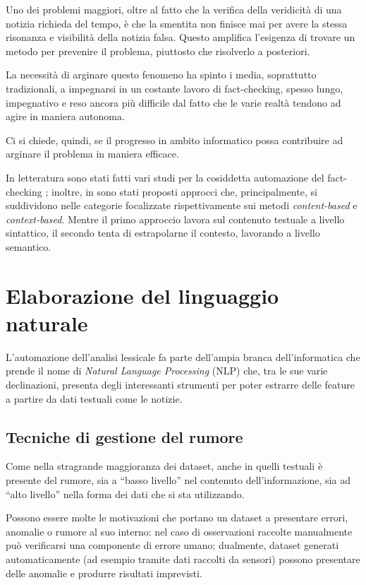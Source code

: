\documentclass[12pt]{report}
\theoremstyle{definition}
\begin{document}
Uno dei problemi maggiori, oltre al fatto che la verifica della veridicità di una notizia richieda del tempo, è che la smentita non finisce mai per avere la stessa risonanza e visibilità della notizia falsa. Questo amplifica l'esigenza di trovare un metodo per prevenire il problema, piuttosto che risolverlo a posteriori.

La necessità di arginare questo fenomeno ha spinto i media, soprattutto tradizionali, a impegnarsi in un costante lavoro di fact-checking, spesso lungo, impegnativo e reso ancora più difficile dal fatto che le varie realtà tendono ad agire in maniera autonoma.

Ci si chiede, quindi, se il progresso in ambito informatico possa contribuire ad arginare il problema in maniera efficace.

In letteratura sono stati fatti vari studi per la cosiddetta automazione del fact-checking \cite{5, 6, 8, 9, 10, 11}; inoltre, in \cite{15, 16, 21} sono stati proposti approcci che, principalmente, si suddividono nelle categorie focalizzate rispettivamente sui metodi \textit{content-based} e \textit{context-based}.
Mentre il primo approccio lavora sul contenuto testuale a livello sintattico, il secondo tenta di estrapolarne il contesto, lavorando a livello semantico.

\section{Elaborazione del linguaggio naturale} \label{nlp}
L'automazione dell'analisi lessicale fa parte dell'ampia branca dell'informatica che prende il nome di \textit{Natural Language Processing} (NLP) che, tra le sue varie declinazioni, presenta degli interessanti strumenti per poter estrarre delle feature a partire da dati testuali come le notizie.


\subsection{Tecniche di gestione del rumore} \label{clean}
Come nella stragrande maggioranza dei dataset, anche in quelli testuali è presente del rumore, sia a ``basso livello'' nel contenuto dell'informazione, sia ad ``alto livello'' nella forma dei dati che si sta utilizzando.

Possono essere molte le motivazioni che portano un dataset a presentare errori, anomalie o rumore al suo interno: 
nel caso di osservazioni raccolte manualmente può verificarsi una componente di errore umano; dualmente, dataset generati automaticamente (ad esempio tramite dati raccolti da sensori) possono presentare delle anomalie e produrre risultati imprevisti.
\end{document}
